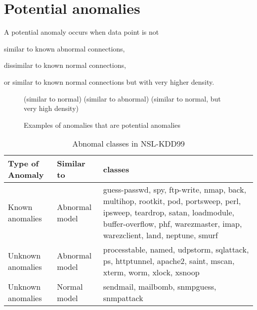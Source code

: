 \section{Potential anomalies}
A potential anomaly occurs when data point is not \begin{inparaenum}
\item similar to known abnormal connections,
\item dissimilar to known normal connections,
\item or similar to known normal connections but with very higher density.
\end{inparaenum} 





\begin{figure}[htb2]
\begin{center}
(similar to normal)
(similar to abnormal)
(similar to normal, but very high density)
\end{center}
\caption{Examples of anomalies that are potential anomalies}
\label{fig:refSingleRobot1}
\end{figure}

\begin{table}[h]
\begin{center}
\begin{tabular}{| l | l | p{5cm} |}
\hline
Type of Anomaly & Similar to & classes \\
\hline
Known anomalies & Abnormal model & guess-passwd, spy, ftp-write, nmap, back, multihop, rootkit, pod, portsweep, perl, ipsweep, teardrop, satan, loadmodule, buffer-overflow, phf, warezmaster, imap, warezclient, land, neptune, smurf \\ %
\hline
Unknown anomalies & Abnormal model & processtable, named, udpstorm, sqlattack, ps, httptunnel, apache2, saint, mscan, xterm, worm, xlock, xsnoop \\ %
\hline
Unknown anomalies & Normal model & sendmail, mailbomb, snmpguess, snmpattack \\ %
\hline
\end{tabular}
\end{center}
\caption{Abnomal classes in NSL-KDD99}
\label{fig:refSingleRobot1}
\end{table}
